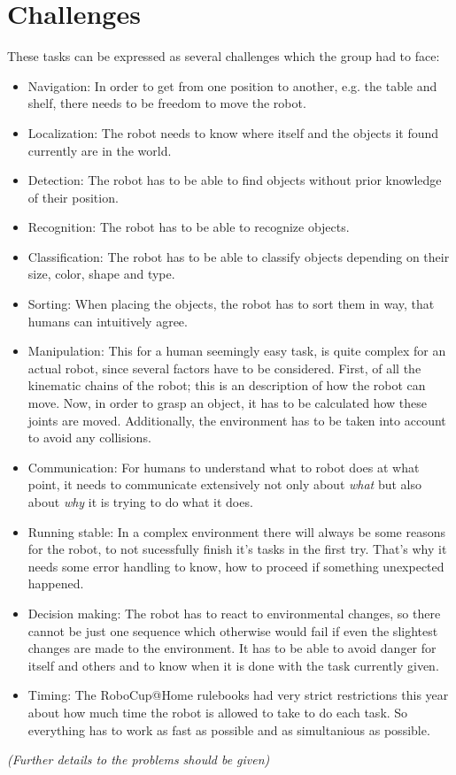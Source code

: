 \documentclass[main.tex]{subfiles}
\begin{document}
	\section{Challenges} 
	These tasks can be expressed as several challenges which the group had to face:
	\begin{itemize}
		\item Navigation: In order to get from one position to another, e.g. the table and shelf, there needs to be freedom to move the robot. 
		\item Localization: The robot needs to know where itself and the objects it found currently are in the world.
		\item Detection: The robot has to be able to find objects without prior knowledge of their position.
		\item Recognition: The robot has to be able to recognize objects.
		\item Classification: The robot has to be able to classify objects depending on their size, color, shape and type.
		\item Sorting: When placing the objects, the robot has to sort them in way, that humans can intuitively agree.
		\item Manipulation: This for a human seemingly easy task, is quite complex for an actual robot, since several factors have to be considered. First, of all the kinematic chains of the robot; this is an description of how the robot can move. Now, in order to grasp an object, it has to be calculated how these joints are moved. Additionally, the environment has to be taken into account to avoid any collisions.
		\item Communication: For humans to understand what to robot does at what point, it needs to communicate extensively not only about \textit{what} but also about \textit{why} it is trying to do what it does.
		\item Running stable: In a complex environment there will always be some reasons for the robot, to not sucessfully finish it's tasks in the first try. That's why it needs some error handling to know, how to proceed if something unexpected happened.
		\item Decision making: The robot has to react to environmental changes, so there cannot be just one sequence which otherwise would fail if even the slightest changes are made to the environment. It has to be able to avoid danger for itself and others and to know when it is done with the task currently given.
		\item Timing: The RoboCup@Home rulebooks had very strict restrictions this year about how much time the robot is allowed to take to do each task. So everything has to work as fast as possible and as simultanious as possible.
		
	\end{itemize}
	
	\textit{(Further details to the problems should be given)}	
	
\end{document}
